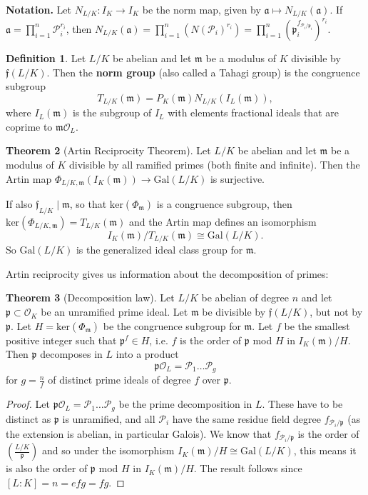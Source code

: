 \documentclass{article}
\theoremstyle{definition}
\newtheorem{theorem}{Theorem}[section]
\newtheorem{defn}[theorem]{Definition}
\begin{document}
\textbf{Notation.} Let $N_{L/K}: I_K \to I_K$ be the norm map, given by $\mathfrak{a} \mapsto N_{L/K}(\mathfrak{a})$. If $\mathfrak{a} =\prod_{i=1}^{n} \mathcal{P}_i^{r_i}$, then $N_{L/K}(\mathfrak{a}) = \prod_{i=1}^{n} (N(\mathcal{P}_i)^{r_i}) = \prod_{i=1}^{n} (\mathfrak{p}_i^{f_{\mathcal{P}_i/\mathfrak{p}_i}})^{r_i}$.
\begin{defn}
    Let $L/K$ be abelian and let $\mathfrak{m}$ be a modulus of $K$ divisible by $\mathfrak{f}(L/K)$. Then the \textbf{norm group} (also called a Tahagi group) is the congruence subgroup
    \[
    T_{L/K}(\mathfrak{m}) = P_K(\mathfrak{m})N_{L/K}(I_L(\mathfrak{m})),
    \]
    where $I_L(\mathfrak{m})$ is the subgroup of $I_L$ with elements fractional ideals that are coprime to $\mathfrak{m}\mathcal{O}_L$.
\end{defn}
\begin{theorem}[Artin Reciprocity Theorem]
    Let $L/K$ be abelian and let $\mathfrak{m}$ be a modulus of $K$ divisible by all ramified primes (both finite and infinite). Then the Artin map $\Phi_{L/K,\mathfrak{m}}(I_K(\mathfrak{m})) \to \text{Gal}(L/K)$ is surjective.
    \vspace{1mm}
     
    If also $\mathfrak{f}_{L/K} \mid \mathfrak{m}$, so that $\text{ker}(\Phi_{\mathfrak{m}})$ is a congruence subgroup, then $\text{ker}(\Phi_{L/K,\mathfrak{m}}) = T_{L/K}(\mathfrak{m})$ and the Artin map defines an isomorphism \[
    I_K(\mathfrak{m})/T_{L/K}(\mathfrak{m}) \cong \text{Gal}(L/K).
    \]
    So $\text{Gal}(L/K)$ is the generalized ideal class group for $\mathfrak{m}$. 
\end{theorem}
Artin reciprocity gives us information about the decomposition of primes:
\begin{theorem}[Decomposition law]
    Let $L/K$ be abelian of degree $n$ and let $\mathfrak{p} \subset \mathcal{O}_K$ be an unramified prime ideal. Let $\mathfrak{m}$ be divisible by $\mathfrak{f}(L/K)$, but not by $\mathfrak{p}$. Let $H = \text{ker}(\Phi_{\mathfrak{m}})$ be the congruence subgroup for $\mathfrak{m}$. Let $f$ be the smallest positive integer such that $\mathfrak{p}^{f} \in H$, i.e. $f$ is the order of $\mathfrak{p}$ mod $H$ in $I_K(\mathfrak{m})/H$. Then $\mathfrak{p}$ decomposes in $L$ into a product $$\mathfrak{p}\mathcal{O}_L = \mathcal{P}_1 \ldots \mathcal{P}_g$$ for $g = \frac{n}{f}$ of distinct prime ideals of degree $f$ over $\mathfrak{p}$.
\end{theorem}
\begin{proof}
    Let $\mathfrak{p}\mathcal{O}_L = \mathcal{P}_1\ldots\mathcal{P}_g$ be the prime decomposition in $L$. These have to be distinct as $\mathfrak{p}$ is unramified, and all $\mathcal{P}_i$ have the same residue field degree $f_{\mathcal{P}_i/\mathfrak{p}}$ (as the extension is abelian, in particular Galois). We know that $f_{\mathcal{P}_i/\mathfrak{p}}$ is the order of $\left(\frac{L/K}{\mathfrak{p}}\right)$ and so under the isomorphism $I_K(\mathfrak{m})/H \cong \text{Gal}(L/K)$, this means it is also the order of $\mathfrak{p}$ mod $H$ in $I_K(\mathfrak{m})/H$. The result follows since $[L:K] = n = efg = fg$.
\end{proof}
\end{document}
